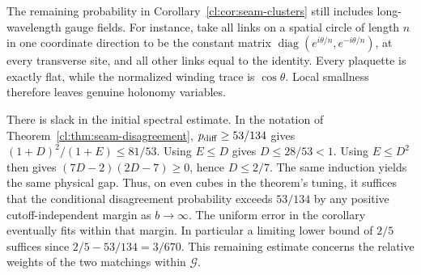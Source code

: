The remaining probability in Corollary~\ref{cl:cor:seam-clusters} still
includes long-wavelength gauge fields. For instance, take all links on
a spatial circle of length $n$ in one coordinate direction to be the
constant matrix $\operatorname{diag}(e^{i\theta/n},e^{-i\theta/n})$,
at every transverse site, and all other links equal to the identity.
Every plaquette is exactly flat, while the normalized winding trace is
$\cos\theta$. Local smallness therefore leaves genuine holonomy variables.

There is slack in the initial spectral estimate. In the notation of
Theorem~\ref{cl:thm:seam-disagreement}, $p_{\rm diff}\ge53/134$ gives
$(1+D)^2/(1+E)\le81/53$. Using $E\le D$ gives $D\le28/53<1$.
Using $E\le D^2$ then gives $(7D-2)(2D-7)\ge0$, hence $D\le2/7$.
The same induction yields the same physical gap. Thus, on even cubes
in the theorem's tuning, it suffices that the conditional disagreement
probability exceeds $53/134$ by any positive cutoff-independent margin
as $b\to\infty$. The uniform error in the corollary eventually fits
within that margin. In particular a limiting lower bound of $2/5$
suffices since $2/5-53/134=3/670$. This remaining estimate concerns
the relative weights of the two matchings within $\mathcal G$.

